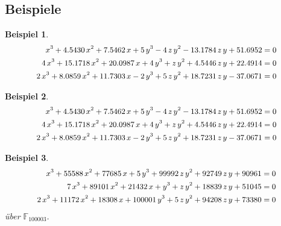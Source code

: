 \documentclass[11pt]{beamer}
\newcommand{\F}[1]{\mathbb{F}_{#1}}
\theoremstyle{custom}
\theoremstyle{custom}
\newtheorem{exm}{Beispiel}[section]
\begin{document}
	\subsection*{Beispiele}
	\begin{frame}
		\begin{exm}
			\begin{equation*}\label{eqn:example3C3_1}
				\small
				\begin{alignedat}{-1}
    x^3+4.5430\,x^2+7.5462\,x+5\,y^3-4\,z\,y^2-13.1784\,z\,y+51.6952&=0\\ 4\,x^3+15.1718\,x^2+20.0987\,x+4\,y^3+z\,y^2+4.5446\,z\,y+22.4914&=0\\ 2\,x^3+8.0859\,x^2+11.7303\,x-2\,y^3+5\,z\,y^2+18.7231\,z\,y-37.0671&=0
				\end{alignedat}
			\end{equation*}
		\end{exm}
	\end{frame}
		\begin{frame}
		\begin{exm}
			\begin{equation*}\label{eqn:example3C3_1}
				\small
				\begin{alignedat}{-1}
					x^3+4.5430\,x^2+7.5462\,x+5\,y^3-4\,z\,y^2-13.1784\,z\,y+51.6952&=0\\ 4\,x^3+15.1718\,x^2+20.0987\,x+4\,y^3+z\,y^2+4.5446\,z\,y+22.4914&=0\\ 2\,x^3+8.0859\,x^2+11.7303\,x-2\,y^3+5\,z\,y^2+18.7231\,z\,y-37.0671&=0
				\end{alignedat}
			\end{equation*}
		\end{exm}
	\end{frame}
		\begin{frame}
		\begin{exm}
			\begin{equation*}\label{eqn:example3C3_1}
				\small
				\begin{alignedat}{-1}
 x^3+55588\,x^2+77685\,x+5\,y^3+99992\,z\,y^2+92749\,z\,y+90961&=0\\
  7\,x^3+89101\,x^2+21432\,x+y^3+z\,y^2+18839\,z\,y+51045&=0\\
   2\,x^3+11172\,x^2+18308\,x+100001\,y^3+5\,z\,y^2+94208\,z\,y+73380&=0
				\end{alignedat}
			\end{equation*}
			über $\F{100003}$.
		\end{exm}
	\end{frame}
\end{document}
